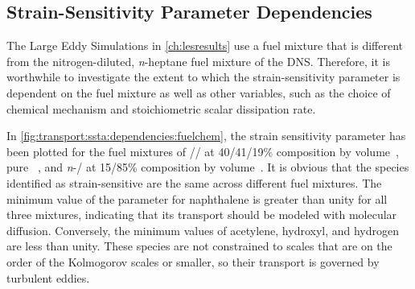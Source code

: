 \subsection{Strain-Sensitivity Parameter Dependencies}
\label{sec:transport:ssta:dependencies}

The Large Eddy Simulations in \cref{ch:lesresults} use a fuel mixture that is different from the nitrogen-diluted, \textit{n}-heptane fuel mixture of the DNS. Therefore, it is worthwhile to investigate the extent to which the strain-sensitivity parameter is dependent on the fuel mixture as well as other variables, such as the choice of chemical mechanism and stoichiometric scalar dissipation rate.

In \cref{fig:transport:ssta:dependencies:fuelchem}, the strain sensitivity parameter has been plotted for the fuel mixtures of // at 40/41/19\% composition by volume~\cite{mahmoud2017}, pure ~\cite{shaddix2010,zhang2011}, and \textit{n}-/ at 15/85\% composition by volume~\cite{bisetti2012,attili2014,attili2015}. It is obvious that the species identified as strain-sensitive are the same across different fuel mixtures. The minimum value of the parameter for naphthalene is greater than unity for all three mixtures, indicating that its transport should be modeled with molecular diffusion. Conversely, the minimum values of acetylene, hydroxyl, and hydrogen are less than unity. These species are not constrained to scales that are on the order of the Kolmogorov scales or smaller, so their transport is governed by turbulent eddies.



